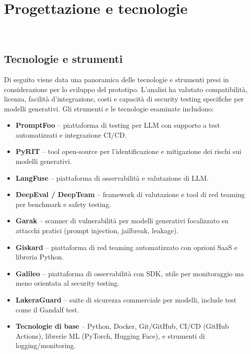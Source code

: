 \chapter{Progettazione e tecnologie}
\label{cap:progettazione-codifica}

\\

\section{Tecnologie e strumenti}
\label{sec:tecnologie-strumenti}

Di seguito viene data una panoramica delle tecnologie e strumenti presi in considerazione per lo sviluppo del prototipo. L'analisi ha valutato compatibilità, licenza, facilità d'integrazione, costi e capacità di security testing specifiche per modelli generativi. Gli strumenti e le tecnologie esaminate includono:

\begin{itemize}
    \item \textbf{PromptFoo} -- piattaforma di testing per LLM con supporto a test automatizzati e integrazione CI/CD.
    \item \textbf{PyRIT} -- tool open-source per l'identificazione e mitigazione dei rischi sui modelli generativi.
    \item \textbf{LangFuse} -- piattaforma di osservabilità e valutazione di LLM.
    \item \textbf{DeepEval / DeepTeam} -- framework di valutazione e tool di red teaming per benchmark e safety testing.
    \item \textbf{Garak} -- scanner di vulnerabilità per modelli generativi focalizzato su attacchi pratici (prompt injection, jailbreak, leakage).
    \item \textbf{Giskard} -- piattaforma di red teaming automatizzato con opzioni SaaS e libreria Python.
    \item \textbf{Galileo} -- piattaforma di osservabilità con SDK, utile per monitoraggio ma meno orientata al security testing.
    \item \textbf{LakeraGuard} -- suite di sicurezza commerciale per modelli, include test come il Gandalf test.
    \item \textbf{Tecnologie di base} -- Python, Docker, Git/GitHub, CI/CD (GitHub Actions), librerie ML (PyTorch, Hugging Face), e strumenti di logging/monitoring.
\end{itemize}

